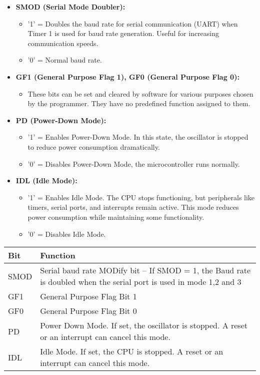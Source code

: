 \documentclass[
]{article}
\begin{document}
\begin{itemize}
\item
  \textbf{SMOD (Serial Mode Doubler):}

  \begin{itemize}
  \item
    '1' = Doubles the baud rate for serial communication (UART) when
    Timer 1 is used for baud rate generation. Useful for increasing
    communication speeds.
  \item
    '0' = Normal baud rate.
  \end{itemize}
\item
  \textbf{GF1 (General Purpose Flag 1), GF0 (General Purpose Flag 0):}

  \begin{itemize}
  \item
    These bits can be set and cleared by software for various purposes
    chosen by the programmer. They have no predefined function assigned
    to them.
  \end{itemize}
\item
  \textbf{PD (Power-Down Mode):}

  \begin{itemize}
  \item
    '1' = Enables Power-Down Mode. In this state, the oscillator is
    stopped to reduce power consumption dramatically.
  \item
    '0' = Disables Power-Down Mode, the microcontroller runs normally.
  \end{itemize}
\item
  \textbf{IDL (Idle Mode):}

  \begin{itemize}
  \item
    '1' = Enables Idle Mode. The CPU stops functioning, but peripherals
    like timers, serial ports, and interrupts remain active. This mode
    reduces power consumption while maintaining some functionality.
  \item
    '0' = Disables Idle Mode.
  \end{itemize}
\end{itemize}

\begin{longtable}[]{@{}ll@{}}
\toprule
Bit & Function \\
\midrule
\endhead
SMOD & Serial baud rate MODify bit -- If SMOD = 1, the Baud rate is
doubled when the serial port is used in mode 1,2 and 3 \\
GF1 & General Purpose Flag Bit 1 \\
GF0 & General Purpose Flag Bit 0 \\
PD & Power Down Mode. If set, the oscillator is stopped. A reset or an
interrupt can cancel this mode. \\
IDL & Idle Mode. If set, the CPU is stopped. A reset or an interrupt can
cancel this mode. \\
\bottomrule
\end{longtable}
\end{document}

